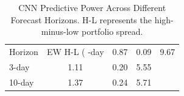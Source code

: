 \begin{table}
\caption{CNN Predictive Power Across Different Forecast Horizons. H-L represents the high-minus-low portfolio spread.}
\label{tab:horizon_eval}
\begin{tabular}{lccc}
\toprule
Horizon & EW H-L (%
-day & 0.87 & 0.09 & 9.67 \\
3-day & 1.11 & 0.20 & 5.55 \\
10-day & 1.37 & 0.24 & 5.71 \\
\bottomrule
\end{tabular}
\end{table}
